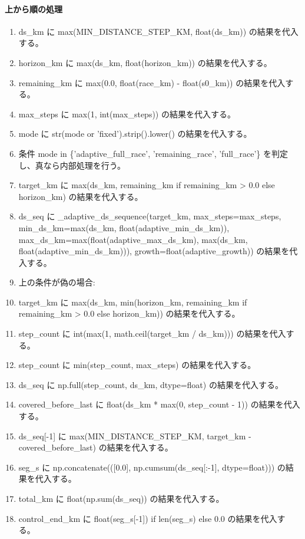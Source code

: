 \documentclass[a4paper,11pt]{article}
\begin{document}
            \paragraph{上から順の処理}
            \begin{enumerate}[leftmargin=1.8em]
            \item ds\_km に max(MIN\_DISTANCE\_STEP\_KM, float(ds\_km)) の結果を代入する。
\item horizon\_km に max(ds\_km, float(horizon\_km)) の結果を代入する。
\item remaining\_km に max(0.0, float(race\_km) - float(s0\_km)) の結果を代入する。
\item max\_steps に max(1, int(max\_steps)) の結果を代入する。
\item mode に str(mode or 'fixed').strip().lower() の結果を代入する。
\item 条件 mode in \{'adaptive\_full\_race', 'remaining\_race', 'full\_race'\} を判定し、真なら内部処理を行う。
\item   target\_km に max(ds\_km, remaining\_km if remaining\_km > 0.0 else horizon\_km) の結果を代入する。
\item   ds\_seq に \_adaptive\_ds\_sequence(target\_km, max\_steps=max\_steps, min\_ds\_km=max(ds\_km, float(adaptive\_min\_ds\_km)), max\_ds\_km=max(float(adaptive\_max\_ds\_km), max(ds\_km, float(adaptive\_min\_ds\_km))), growth=float(adaptive\_growth)) の結果を代入する。
\item   上の条件が偽の場合:
\item   target\_km に max(ds\_km, min(horizon\_km, remaining\_km if remaining\_km > 0.0 else horizon\_km)) の結果を代入する。
\item   step\_count に int(max(1, math.ceil(target\_km / ds\_km))) の結果を代入する。
\item   step\_count に min(step\_count, max\_steps) の結果を代入する。
\item   ds\_seq に np.full(step\_count, ds\_km, dtype=float) の結果を代入する。
\item   covered\_before\_last に float(ds\_km * max(0, step\_count - 1)) の結果を代入する。
\item   ds\_seq[-1] に max(MIN\_DISTANCE\_STEP\_KM, target\_km - covered\_before\_last) の結果を代入する。
\item seg\_s に np.concatenate(([0.0], np.cumsum(ds\_seq[:-1], dtype=float))) の結果を代入する。
\item total\_km に float(np.sum(ds\_seq)) の結果を代入する。
\item control\_end\_km に float(seg\_s[-1]) if len(seg\_s) else 0.0 の結果を代入する。

\end{enumerate}
\end{document}
